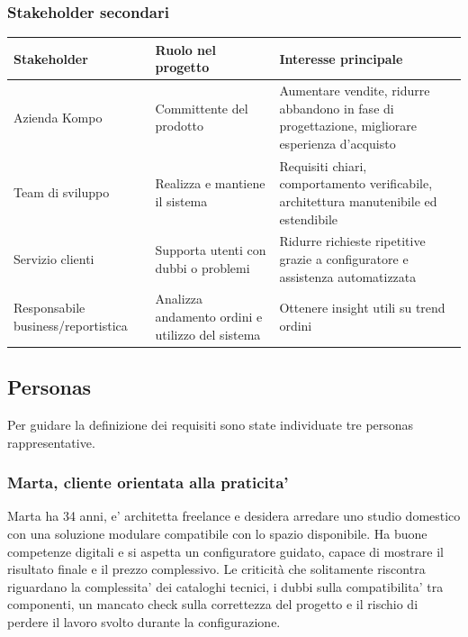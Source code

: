 \subsubsection{Stakeholder secondari}

{\footnotesize
\renewcommand{\arraystretch}{1.2}
\begin{center}
\begin{tabular}{|p{2.6cm}|p{3.1cm}|p{3.4cm}|}
\hline
\textbf{Stakeholder} & \textbf{Ruolo nel progetto} & \textbf{Interesse principale} \\
\hline
Azienda Kompo & Committente del prodotto & Aumentare vendite, ridurre abbandono in fase di progettazione, migliorare esperienza d'acquisto \\
\hline
Team di sviluppo & Realizza e mantiene il sistema & Requisiti chiari, comportamento verificabile, architettura manutenibile ed estendibile \\
\hline
Servizio clienti & Supporta utenti con dubbi o problemi & Ridurre richieste ripetitive grazie a configuratore e assistenza automatizzata \\
\hline
Responsabile business/reportistica & Analizza andamento ordini e utilizzo del sistema & Ottenere insight utili su trend ordini \\
\hline
\end{tabular}
\end{center}
}

\subsection{Personas}

Per guidare la definizione dei requisiti sono state individuate tre personas rappresentative.

\subsubsection{Marta, cliente orientata alla praticita'}

Marta ha 34 anni, e' architetta freelance e desidera arredare uno studio domestico con una soluzione modulare compatibile con lo spazio disponibile. 
Ha buone competenze digitali e si aspetta un configuratore guidato, capace di mostrare il risultato finale e il prezzo complessivo.
Le criticità che solitamente riscontra riguardano la complessita' dei cataloghi tecnici, i dubbi sulla compatibilita' tra componenti, un mancato check sulla correttezza del progetto e il rischio di perdere il lavoro svolto durante la configurazione.

